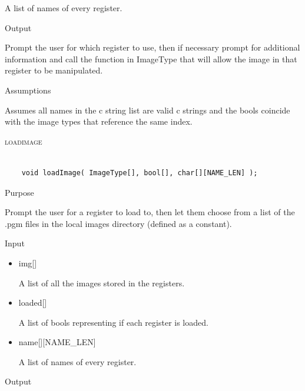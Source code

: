 \documentclass[pdftex, 11pt]{article}
\begin{document}
\begin{description}
\begin{description}
\begin{itemize}
						A list of names of every register.

				\end{itemize}

			\item{Output}

				Prompt the user for which register to use, then if necessary
				prompt for additional information and call the function
				in ImageType that will allow the image in that register to
				be manipulated.

			\item{Assumptions}

				Assumes all names in the c string list are valid c
				strings and the bools coincide with the image types that
				reference the same index.

		\end{description}



	\item{\textsc{loadimage}}

		\begin{lstlisting}

	void loadImage( ImageType[], bool[], char[][NAME_LEN] );
		\end{lstlisting}

		\begin{description}
			\item{Purpose}

				Prompt the user for a register to load to, then let them choose from a list
				of the .pgm files in the local images directory (defined as a constant).

			\item{Input}

				\begin{itemize}

					\item{img[]}

						A list of all the images stored in the registers.

					\item{loaded[]}

						A list of bools representing if each register is loaded.

					\item{name[][NAME\_LEN]}

						A list of names of every register.

				\end{itemize}

			\item{Output}


\end{description}
\end{description}
\end{document}
